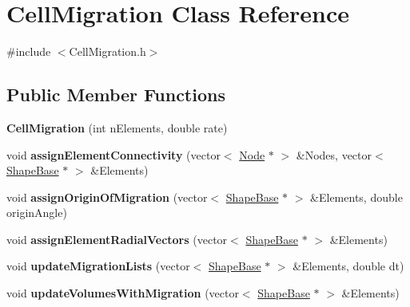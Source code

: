 \hypertarget{classCellMigration}{}\section{Cell\+Migration Class Reference}
\label{classCellMigration}


{\ttfamily \#include $<$Cell\+Migration.\+h$>$}

\subsection*{Public Member Functions}
\begin{DoxyCompactItemize}
\item 
\hypertarget{classCellMigration_a0c5c5f1eb9ab755dd01f093a1a90b822}{}{\bfseries Cell\+Migration} (int n\+Elements, double rate)\label{classCellMigration_a0c5c5f1eb9ab755dd01f093a1a90b822}

\item 
\hypertarget{classCellMigration_aecbcc5455204307fc98cadd3d1e56ba7}{}void {\bfseries assign\+Element\+Connectivity} (vector$<$ \hyperlink{classNode}{Node} $\ast$ $>$ \&Nodes, vector$<$ \hyperlink{classShapeBase}{Shape\+Base} $\ast$ $>$ \&Elements)\label{classCellMigration_aecbcc5455204307fc98cadd3d1e56ba7}

\item 
\hypertarget{classCellMigration_a14a55a081fe720f504c8b6edf1dac5cd}{}void {\bfseries assign\+Origin\+Of\+Migration} (vector$<$ \hyperlink{classShapeBase}{Shape\+Base} $\ast$ $>$ \&Elements, double origin\+Angle)\label{classCellMigration_a14a55a081fe720f504c8b6edf1dac5cd}

\item 
\hypertarget{classCellMigration_a8b654058fd2c443c8fa46957cff2e392}{}void {\bfseries assign\+Element\+Radial\+Vectors} (vector$<$ \hyperlink{classShapeBase}{Shape\+Base} $\ast$ $>$ \&Elements)\label{classCellMigration_a8b654058fd2c443c8fa46957cff2e392}

\item 
\hypertarget{classCellMigration_ab73cda2dae492284d57fa466682e9f6f}{}void {\bfseries update\+Migration\+Lists} (vector$<$ \hyperlink{classShapeBase}{Shape\+Base} $\ast$ $>$ \&Elements, double dt)\label{classCellMigration_ab73cda2dae492284d57fa466682e9f6f}

\item 
\hypertarget{classCellMigration_a0a45d01aed5d8c034ace224925bd0a6e}{}void {\bfseries update\+Volumes\+With\+Migration} (vector$<$ \hyperlink{classShapeBase}{Shape\+Base} $\ast$ $>$ \&Elements)\label{classCellMigration_a0a45d01aed5d8c034ace224925bd0a6e}


\end{DoxyCompactItemize}
